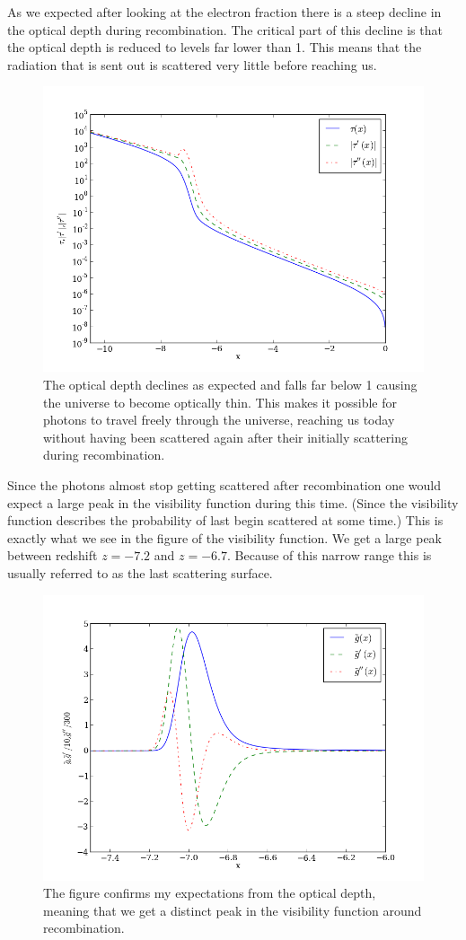 \documentclass{aa}   %
\begin{document}
As we expected after looking at the electron fraction there is a steep decline in the optical depth during recombination.
The critical part of this decline is that the optical depth is reduced to levels far lower than 1. This means that the radiation that is sent out is scattered very little before reaching us.


  \begin{figure}[ht]
   \includegraphics[width=.49\textwidth]{tau.png}
   \caption{The optical depth declines as expected and falls far below 1 causing the universe to become optically thin. This makes it possible for photons to travel freely through the universe, reaching us today without having been scattered again after their initially scattering during recombination.}
   \label{fig:tau}
  \end{figure}
 
Since the photons almost stop getting scattered after recombination one would expect a large peak in the visibility function during this time. (Since the visibility function describes the probability of last begin scattered at some time.) This is exactly what we see in the figure of the visibility function. We get a large peak between redshift $z=-7.2$ and $z=-6.7$. Because of this narrow range this is usually referred to as the last scattering surface.
 
   \begin{figure}[ht]
   \includegraphics[width=.49\textwidth]{g.png}
   \caption{The figure confirms my expectations from the optical depth, meaning that we get a distinct peak in the visibility function around recombination.}
  \label{fig:g}
  \end{figure}
\end{document}
